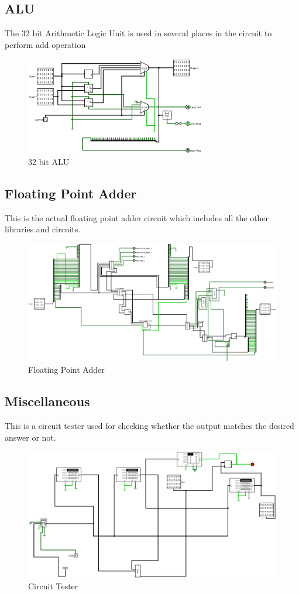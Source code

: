 \documentclass[12pt]{article}
\begin{document}
\subsection{ALU}
The 32 bit Arithmetic Logic Unit is used in several places in the circuit to perform add operation
\begin{figure}[H]
    \centering
    \includegraphics[width=0.7\textwidth]{ALU_32_bit.jpg}
    \caption{32 bit ALU}
    \label{fig:alu}
\end{figure}

\subsection{Floating Point Adder}
This is the actual floating point adder circuit which includes all the other libraries and circuits.
\begin{figure}[H]
    \centering
        \includegraphics[width=\textwidth]{FPA.jpg}
    \caption{Floating Point Adder}\label{fig:fpa}
\end{figure}
\newpage
\subsection{Miscellaneous}
This is a circuit tester used for checking whether the output matches the desired answer or not. 
\begin{figure}[H]
    \centering
        \includegraphics[width=\textwidth]{Circuit_Tester_Using_RAM.jpg}
    \caption{Circuit Tester}\label{fig:circtest}
\end{figure}
    
\end{document}
